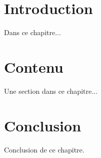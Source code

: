 \section{Introduction}
Dans ce chapitre...
\section{Contenu}
Une section dans ce chapitre...
\section{Conclusion}
Conclusion de ce chapitre.